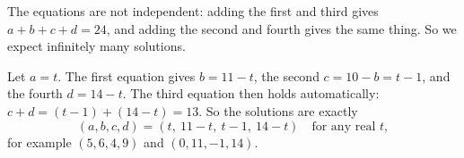 The equations are not independent: adding the first and third gives $a+b+c+d=24$, and adding the second and fourth gives the same thing. So we expect infinitely many solutions.

Let $a=t$. The first equation gives $b=11-t$, the second $c=10-b=t-1$, and the fourth $d=14-t$. The third equation then holds automatically: $c+d=(t-1)+(14-t)=13$. So the solutions are exactly
\[\boxed{(a,b,c,d)=(t,\ 11-t,\ t-1,\ 14-t)\quad\text{for any real }t},\]
for example $(5,6,4,9)$ and $(0,11,-1,14)$.
